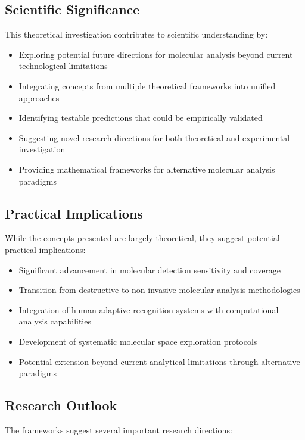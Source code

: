 \documentclass[11pt,a4paper]{article}
\theoremstyle{remark}
\begin{document}
\subsection{Scientific Significance}

This theoretical investigation contributes to scientific understanding by:

\begin{itemize}
\item Exploring potential future directions for molecular analysis beyond current technological limitations
\item Integrating concepts from multiple theoretical frameworks into unified approaches
\item Identifying testable predictions that could be empirically validated
\item Suggesting novel research directions for both theoretical and experimental investigation
\item Providing mathematical frameworks for alternative molecular analysis paradigms
\end{itemize}

\subsection{Practical Implications}

While the concepts presented are largely theoretical, they suggest potential practical implications:

\begin{itemize}
\item Significant advancement in molecular detection sensitivity and coverage
\item Transition from destructive to non-invasive molecular analysis methodologies
\item Integration of human adaptive recognition systems with computational analysis capabilities
\item Development of systematic molecular space exploration protocols
\item Potential extension beyond current analytical limitations through alternative paradigms
\end{itemize}

\subsection{Research Outlook}

The frameworks suggest several important research directions:
\end{document}
